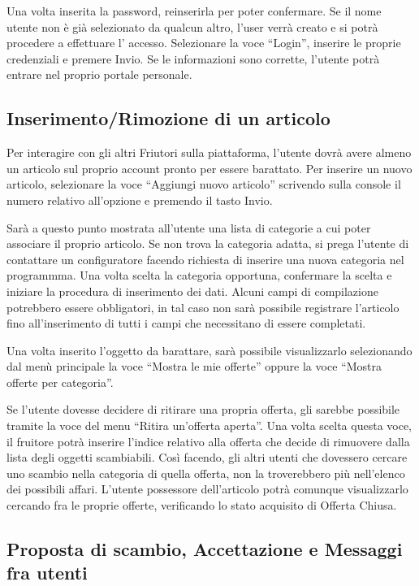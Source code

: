 Una volta inserita la password, reinserirla per poter confermare. Se il nome utente non è già selezionato da qualcun altro, l'user verrà creato e si potrà procedere a effettuare l' accesso.
Selezionare la voce ``Login'', inserire le proprie credenziali e premere Invio. Se le informazioni sono corrette, l'utente potrà entrare nel proprio portale personale.

\subsection{Inserimento/Rimozione di un articolo}
Per interagire con gli altri Friutori sulla piattaforma, l'utente dovrà avere almeno un articolo sul proprio account pronto per essere barattato.
Per inserire un nuovo articolo, selezionare la voce ``Aggiungi nuovo articolo'' scrivendo sulla console il numero relativo all'opzione e premendo il tasto Invio.

Sarà a questo punto mostrata all'utente una lista di categorie a cui poter associare il proprio articolo. Se non trova la categoria adatta, si prega l'utente di contattare un configuratore facendo richiesta di inserire una nuova categoria nel programmma.
Una volta scelta la categoria opportuna, confermare la scelta e iniziare la procedura di inserimento dei dati. Alcuni campi di compilazione potrebbero essere obbligatori, in tal caso non sarà
possibile registrare l'articolo fino all'inserimento di tutti i campi che necessitano di essere completati.

Una volta inserito l'oggetto da barattare, sarà possibile visualizzarlo selezionando dal menù principale la voce ``Mostra le mie offerte'' oppure la voce ``Mostra offerte per categoria''.

Se l'utente dovesse decidere di ritirare una propria offerta, gli sarebbe possibile tramite la voce del menu ``Ritira un'offerta aperta''. Una volta scelta questa voce,
il fruitore potrà inserire l'indice relativo alla offerta che decide di rimuovere dalla lista degli oggetti scambiabili. Così facendo, gli altri utenti che dovessero cercare uno scambio nella categoria di quella offerta,
non la troverebbero più nell'elenco dei possibili affari.
L'utente possessore dell'articolo potrà comunque visualizzarlo cercando fra le proprie offerte, verificando lo stato acquisito di Offerta Chiusa.

\subsection{Proposta di scambio, Accettazione e Messaggi fra utenti}

